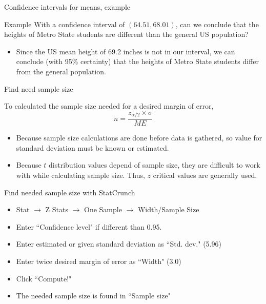\documentclass[xcolor=table]{beamer}
\begin{document}
\begin{frame}{Confidence intervals for means, example}
\begin{exampleblock}{Example}
With a confidence interval of $(64.51, 68.01)$, can we conclude that the heights of Metro State students are different than the general US population?
\begin{itemize}
\pause\item Since the US mean height of 69.2 inches is not in our interval, we can conclude (with 95\% certainty) that the heights of Metro State students differ from the general population.
\end{itemize}
\end{exampleblock}
\end{frame}


\begin{frame}{Find need sample size}
\begin{block}{}
To calculated the sample size needed for a desired margin of error,
\[n = \frac{z_{\alpha/2} \times \sigma}{ME}\]
\begin{itemize}
\pause\item Because sample size calculations are done before data is gathered, so value for standard deviation must be known or estimated.
\pause\item Because $t$ distribution values depend of sample size, they are difficult to work with while calculating sample size. Thus, $z$ critical values are generally used.
\end{itemize}
\end{block}
\end{frame}

\begin{frame}{Find needed sample size with StatCrunch}
\begin{block}{}
\begin{itemize}
\item Stat $\to$ Z Stats $\to$ One Sample $\to$ Width/Sample Size
\item Enter ``Confidence level" if different than 0.95.
\item Enter estimated or given standard deviation as ``Std. dev." (5.96)
\item Enter twice desired margin of error as ``Width" (3.0)
\item Click ``Compute!"
\item The needed sample size is found in ``Sample size"
\end{itemize}
\end{block}

\end{frame}
\end{document}
